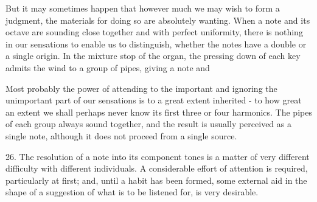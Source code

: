 But it may sometimes happen that however much we may wish to form a judgment,
the materials for doing so are absolutely wanting. When a note and its octave
are sounding close together and with perfect uniformity, there is nothing in
our sensations to enable us to distinguish, whether the notes have a double or
a single origin. In the mixture stop of the organ, the pressing down of each
key admits the wind to a group of pipes, giving a note and

Most probably the power of attending to the important and ignoring the
unimportant part of our sensations is to a great extent inherited - to how
great an extent we shall perhaps never know its first three or four harmonics.
The pipes of each group always sound together, and the result is usually
perceived as a single note, although it does not proceed from a single source.


26. The resolution of a note into its component tones is a matter of very
different difficulty with different individuals. A considerable effort of
attention is required, particularly at first; and, until a habit has been
formed, some external aid in the shape of a suggestion of what is to be
listened for, is very desirable.


